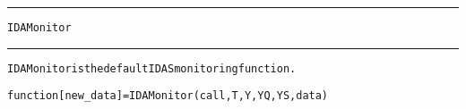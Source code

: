 \begin{samepage}
\hrule
\begin{center}
{\large \verb!IDAMonitor!}
\label{p:IDAMonitor}
\end{center}
\hrule\vspace{0.1in}



\begin{alltt}
IDAMonitor is the default IDAS monitoring function.
\end{alltt}

\end{samepage}



\begin{samepage}


\begin{alltt}
function [new_data] = IDAMonitor(call, T, Y, YQ, YS, data) 
\end{alltt}

\end{samepage}



